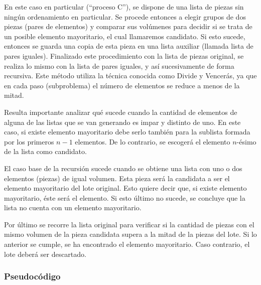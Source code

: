 \documentclass{article}
\begin{document}
En este caso en particular (“proceso C”), se dispone de una lista de piezas sin ningún ordenamiento en particular. 
Se procede entonces a elegir grupos de dos piezas (pares de elementos) y comparar sus volúmenes para decidir si se trata de un posible elemento mayoritario, el cual llamaremos candidato. 
Si esto sucede, entonces se guarda una copia de esta pieza en una lista auxiliar (llamada lista de pares iguales). 
Finalizado este procedimiento con la lista de piezas original, se realiza lo mismo con la lista de pares iguales, y así sucesivamente de forma recursiva. 
Este  método utiliza la técnica conocida como Divide y Vencerás, ya que en cada paso (subproblema) el número de elementos se reduce a menos de la mitad.

Resulta importante analizar qué sucede cuando la cantidad de elementos de alguna de las listas que se van generando es impar y distinto de uno. 
En este caso, si existe elemento mayoritario debe serlo también para la sublista formada por los primeros \(n-1\) elementos. 
De lo contrario, se escogerá el elemento \(n\)-ésimo de la lista como candidato.

El caso base de la recursión sucede cuando se obtiene una lista con uno o dos elementos (piezas) de igual volumen. 
Esta pieza será la candidata a ser el elemento mayoritario del lote original. Esto quiere decir que, si existe elemento mayoritario, éste será el elemento. 
Si esto último no sucede, se concluye que la lista no cuenta con un elemento mayoritario.

Por último se recorre la lista original para verificar si la cantidad de piezas con el mismo volumen de la pieza candidata supera a la mitad de la piezas del lote. 
Si lo anterior se cumple, se ha encontrado el elemento mayoritario. 
Caso contrario, el lote deberá ser descartado.


\subsubsection{Pseudocódigo}
\end{document}
